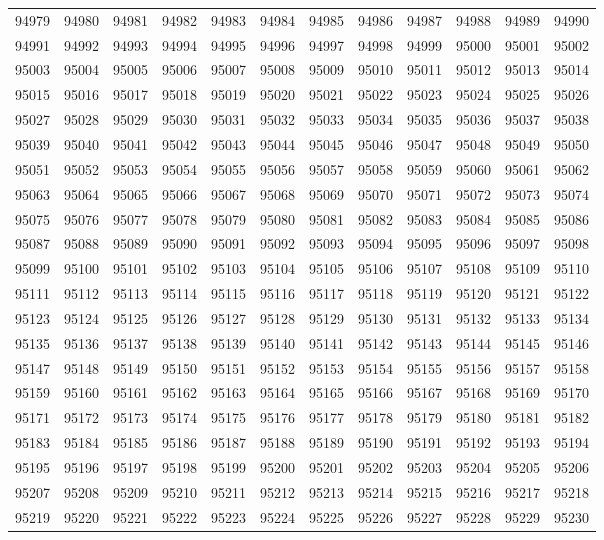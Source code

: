 \begin{center}
\begin{longtable}{llllllllllll}
94979 &94980 &94981 &94982 &94983 &94984 &94985 &94986 &94987 &94988 &94989 &94990 \\
94991 &94992 &94993 &94994 &94995 &94996 &94997 &94998 &94999 &95000 &95001 &95002 \\
95003 &95004 &95005 &95006 &95007 &95008 &95009 &95010 &95011 &95012 &95013 &95014 \\
95015 &95016 &95017 &95018 &95019 &95020 &95021 &95022 &95023 &95024 &95025 &95026 \\
95027 &95028 &95029 &95030 &95031 &95032 &95033 &95034 &95035 &95036 &95037 &95038 \\
95039 &95040 &95041 &95042 &95043 &95044 &95045 &95046 &95047 &95048 &95049 &95050 \\
95051 &95052 &95053 &95054 &95055 &95056 &95057 &95058 &95059 &95060 &95061 &95062 \\
95063 &95064 &95065 &95066 &95067 &95068 &95069 &95070 &95071 &95072 &95073 &95074 \\
95075 &95076 &95077 &95078 &95079 &95080 &95081 &95082 &95083 &95084 &95085 &95086 \\
95087 &95088 &95089 &95090 &95091 &95092 &95093 &95094 &95095 &95096 &95097 &95098 \\
95099 &95100 &95101 &95102 &95103 &95104 &95105 &95106 &95107 &95108 &95109 &95110 \\
95111 &95112 &95113 &95114 &95115 &95116 &95117 &95118 &95119 &95120 &95121 &95122 \\
95123 &95124 &95125 &95126 &95127 &95128 &95129 &95130 &95131 &95132 &95133 &95134 \\
95135 &95136 &95137 &95138 &95139 &95140 &95141 &95142 &95143 &95144 &95145 &95146 \\
95147 &95148 &95149 &95150 &95151 &95152 &95153 &95154 &95155 &95156 &95157 &95158 \\
95159 &95160 &95161 &95162 &95163 &95164 &95165 &95166 &95167 &95168 &95169 &95170 \\
95171 &95172 &95173 &95174 &95175 &95176 &95177 &95178 &95179 &95180 &95181 &95182 \\
95183 &95184 &95185 &95186 &95187 &95188 &95189 &95190 &95191 &95192 &95193 &95194 \\
95195 &95196 &95197 &95198 &95199 &95200 &95201 &95202 &95203 &95204 &95205 &95206 \\
95207 &95208 &95209 &95210 &95211 &95212 &95213 &95214 &95215 &95216 &95217 &95218 \\
95219 &95220 &95221 &95222 &95223 &95224 &95225 &95226 &95227 &95228 &95229 &95230 \\

\end{longtable}
\end{center}

